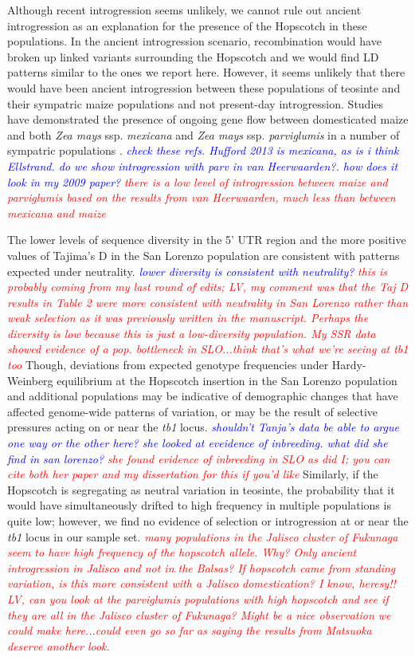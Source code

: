 \documentclass[12pt]{article}
\newcommand{\jri}[1]{\textcolor{blue}{ \emph{\scriptsize  #1}} }
\newcommand{\mbh}[1]{\textcolor{red}{ \emph{\scriptsize  #1}} }
\begin{document}
Although recent introgression seems unlikely, we cannot rule out ancient introgression as an explanation for the presence of the Hopscotch in these populations. In the ancient introgression scenario, recombination would have broken up linked variants surrounding the Hopscotch and we would find LD patterns similar to the ones we report here. However, it seems unlikely that there would have been ancient introgression between these populations of teosinte and their sympatric maize populations and not present-day introgression. Studies have demonstrated the presence of ongoing gene flow between domesticated maize and both \emph{Zea mays} ssp. \emph{mexicana} and \emph{Zea mays} ssp. \emph{parviglumis} in a number of sympatric populations \cite{Hufford et al 2013, Ellstrand et al 2007, van Heerwaarden et al 2011}. \jri{check these refs. Hufford 2013 is mexicana, as is i think Ellstrand. do we show introgression with parv in van Heerwaarden?. how does it look in my 2009 paper?} \mbh{there is a low level of introgression between maize and \emph{parviglumis} based on the results from van Heerwaarden, much less than between \emph{mexicana} and maize}

The lower levels of sequence diversity in the 5' UTR region and the more positive values of Tajima's D in the San Lorenzo population are consistent with patterns expected under neutrality. \jri{lower diversity is consistent with neutrality?} \mbh{this is probably coming from my last round of edits; LV, my comment was that the Taj D results in Table 2 were more consistent with neutrality in San Lorenzo rather than weak selection as it was previously written in the manuscript.  Perhaps the diversity is low because this is just a low-diversity population.  My SSR data showed evidence of a pop. bottleneck in SLO...think that's what we're seeing at tb1 too} Though, deviations from expected genotype frequencies under Hardy-Weinberg equilibrium at the Hopscotch insertion in the San Lorenzo population and additional populations may be indicative of demographic changes that have affected genome-wide patterns of variation, or may be the result of selective pressures acting on or near the \emph{tb1} locus. \jri{shouldn't Tanja's data be able to argue one way or the other here? she looked at eveidence of inbreeding. what did she find in san lorenzo?} \mbh{she found evidence of inbreeding in SLO as did I; you can cite both her paper and my dissertation for this if you'd like} Similarly, if the Hopscotch is segregating as neutral variation in teosinte, the probability that it would have simultaneously drifted to high frequency in multiple populations is quite low; however, we find no evidence of selection or introgression at or near the \emph{tb1} locus in our sample set. \mbh{many populations in the Jalisco cluster of Fukunaga seem to have high frequency of the hopscotch allele.  Why?  Only ancient introgression in Jalisco and not in the Balsas? If hopscotch came from standing variation, is this more consistent with a Jalisco domestication?  I know, heresy!!  LV, can you look at the \emph{parviglumis} populations with high hopscotch and see if they are all in the Jalisco cluster of Fukunaga?  Might be a nice observation we could make here...could even go so far as saying the results from Matsuoka deserve another look.}
\end{document}
